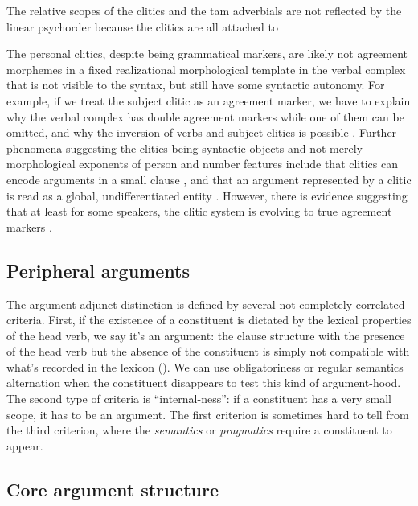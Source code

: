 \documentclass[a4paper, oneside, 12pt]{report}
\newcommand*{\citepage}[1]{p.~{#1}}
\begin{document}
The relative scopes of the clitics and the \ac{tam} adverbials are not reflected by the linear psychorder because the clitics are all attached to

The personal clitics, despite being grammatical markers,
are likely not agreement morphemes in a fixed realizational morphological template in the verbal complex
that is not visible to the syntax,
but still have some syntactic autonomy.
For example, if we treat the subject clitic as an agreement marker,
we have to explain why the verbal complex has double agreement markers
while one of them can be omitted,
and why the inversion of verbs and subject clitics is possible
\citep{de2005french}.
Further phenomena suggesting the clitics being syntactic objects
and not merely morphological exponents of person and number features
include that clitics can encode arguments in a small clause 
\citep{sportiche2005clitic},
and that an argument represented by a clitic is read as a global, undifferentiated entity
\citep[\citepage{131}]{rowlett2007syntax}.
However, there is evidence suggesting that at least for some speakers,
the clitic system is evolving to true agreement markers
\citep{culbertson2010convergent}.

\subsection{Peripheral arguments}\label{sec:grammatical.clause.peripheral}

The argument-adjunct distinction is defined by several not completely correlated criteria.
First, if the existence of a constituent is dictated by the lexical properties of the head verb, we say it's an argument:
the clause structure with the presence of the head verb but the absence of the constituent is simply not compatible with what's recorded in the lexicon ().
We can use obligatoriness or regular semantics alternation when the constituent disappears to test this kind of argument-hood.
The second type of criteria is ``internal-ness'':
if a constituent has a very small scope, it has to be an argument.
The first criterion is sometimes hard to tell from the third criterion,
where the \emph{semantics} or \emph{pragmatics} require a constituent to appear.

\subsection{Core argument structure}
\end{document}
